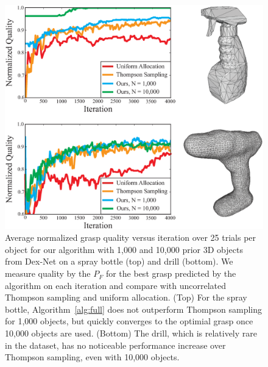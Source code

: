 \begin{figure}[t!]
\centering
\includegraphics[scale=0.31]{figures/illustrations/avg_reward_drill.eps}
\caption{Average normalized grasp quality versus iteration over 25 trials per object for our algorithm with 1,000 and 10,000 prior 3D objects from Dex-Net on a spray bottle (top) and drill (bottom). We measure quality by the $P_F$ for the best grasp predicted by the algorithm on each iteration and compare with uncorrelated Thompson sampling and uniform allocation. (Top) For the spray bottle, Algorithm~\ref{alg:full} does not outperform Thompson sampling for 1,000 objects, but quickly converges to the optimial grasp once 10,000 objects are used. (Bottom) The drill, which is relatively rare in the dataset, has no noticeable performance increase over Thompson sampling, even with 10,000 objects.}
\vspace*{-15pt}
\end{figure}

